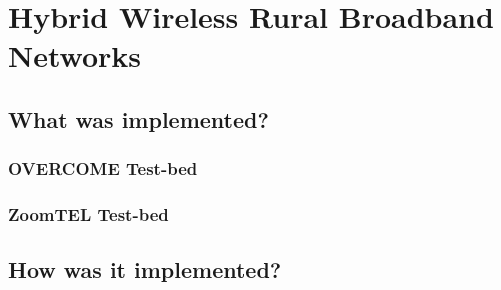 \chapter{Hybrid Wireless Rural Broadband Networks}
\label{chapter3}


\section{What was implemented?}

\subsection{OVERCOME Test-bed}


\subsection{ZoomTEL Test-bed}



\section{How was it implemented?}

